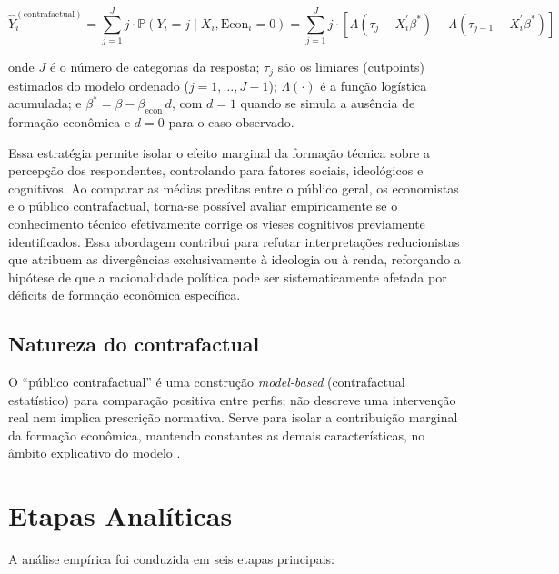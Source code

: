 \[
\hat{Y}_i^{(\text{contrafactual})} = \sum_{j=1}^J j \cdot \mathbb{P}(Y_i = j \mid X_i, \text{Econ}_i = 0) = \sum_{j=1}^J j \cdot \left[ \Lambda(\tau_j - X_i^\prime \beta^*) - \Lambda(\tau_{j-1} - X_i^\prime \beta^*) \right]
\]

\noindent onde $J$ é o número de categorias da resposta; $\tau_j$ são os limiares (cutpoints) estimados do modelo ordenado ($j=1,\ldots,J-1$); $\Lambda(\cdot)$ é a função logística acumulada; e $\beta^* = \beta - \beta_{\text{econ}}\, d$, com $d=1$ quando se simula a ausência de formação econômica e $d=0$ para o caso observado.


\bigskip

Essa estratégia permite isolar o efeito marginal da formação técnica sobre a percepção dos respondentes, controlando para fatores sociais, ideológicos e cognitivos. Ao comparar as médias preditas entre o público geral, os economistas e o público contrafactual, torna-se possível avaliar empiricamente se o conhecimento técnico efetivamente corrige os vieses cognitivos previamente identificados. Essa abordagem contribui para refutar interpretações reducionistas que atribuem as divergências exclusivamente à ideologia ou à renda, reforçando a hipótese de que a racionalidade política pode ser sistematicamente afetada por déficits de formação econômica específica.

\subsection{Natureza do contrafactual}
O “público contrafactual” é uma construção \textit{model-based} (contrafactual estatístico) para comparação positiva entre perfis; não descreve uma intervenção real nem implica prescrição normativa. Serve para isolar a contribuição marginal da formação econômica, mantendo constantes as demais características, no âmbito explicativo do modelo \cite{hausman2008}.



\section{Etapas Analíticas}

A análise empírica foi conduzida em seis etapas principais:

